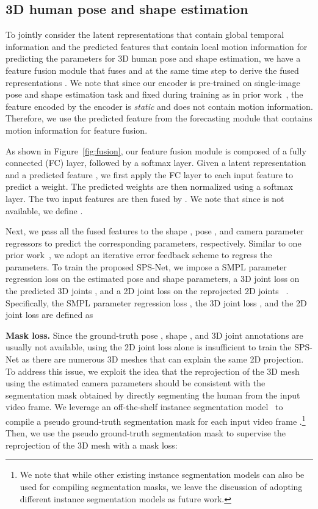 \documentclass[times,referee,twocolumn,final,authoryear]{elsarticle}
\newcommand{\heading}[1]{\noindent\textbf{#1}}
\begin{document}
\subsection{3D human pose and shape estimation}

To jointly consider the latent representations  that contain global temporal information and the predicted features  that contain local motion information for predicting the parameters for 3D human pose and shape estimation, we have a feature fusion module that fuses  and  at the same time step to derive the fused representations .
We note that since our encoder  is pre-trained on single-image pose and shape estimation task and fixed during training as in prior work~\citep{HMR,VIBE}, the feature  encoded by the encoder  is \emph{static} and does not contain motion information.
Therefore, we use the predicted feature  from the forecasting module  that contains motion information for feature fusion.

As shown in Figure~\ref{fig:fusion}, our feature fusion module is composed of a fully connected (FC) layer, followed by a softmax layer.
Given a latent representation  and a predicted feature , we first apply the FC layer to each input feature to predict a weight.
The predicted weights are then normalized using a softmax layer.
The two input features are then fused by .
We note that since  is not available, we define .

Next, we pass all the fused features  to the shape , pose , and camera  parameter regressors to predict the corresponding parameters, respectively.
Similar to one prior work~\citep{HMR}, we adopt an iterative error feedback scheme to regress the parameters.
To train the proposed SPS-Net, we impose a SMPL parameter regression loss  on the estimated pose  and shape  parameters, a 3D joint loss  on the predicted 3D joints , and a 2D joint loss  on the reprojected 2D joints ~\citep{HMR,VIBE}.
Specifically, the SMPL parameter regression loss , the 3D joint loss , and the 2D joint loss  are defined as
\vspace{-3.5mm}


\heading{Mask loss.} 
Since the ground-truth pose , shape , and 3D joint  annotations are usually not available, using the 2D joint loss  alone is insufficient to train the SPS-Net as there are numerous 3D meshes that can explain the same 2D projection.
To address this issue, we exploit the idea that the reprojection of the 3D mesh using the estimated camera parameters should be consistent with the segmentation mask obtained by directly segmenting the human from the input video frame.
We leverage an off-the-shelf instance segmentation model~\citep{YOLACT} to compile a pseudo ground-truth segmentation mask  for each input video frame .\footnote{We note that while other existing instance segmentation models can also be used for compiling segmentation masks, we leave the discussion of adopting different instance segmentation models as future work.}
Then, we use the pseudo ground-truth segmentation mask to supervise the reprojection of the 3D mesh with a mask loss:
\vspace{-1.5mm}  
\end{document}
